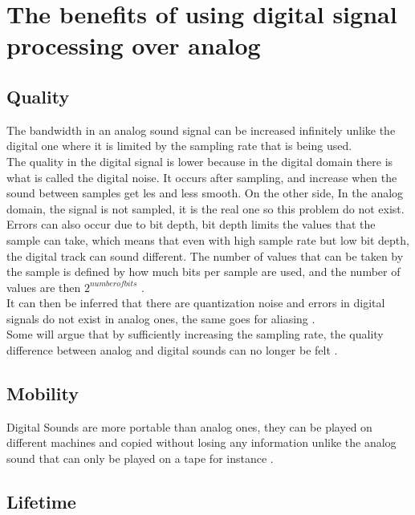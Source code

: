 \section{The benefits of using digital signal processing over analog}
\subsection{Quality}

The bandwidth in an analog sound signal can be increased infinitely unlike the digital one where it is limited by the sampling rate that is being used. \\

The quality in the digital signal is  lower because in the digital domain there is what is called the digital noise. It occurs after sampling, and increase when the sound between samples get les and less smooth. On the other side, In the analog domain, the signal is not sampled, it is the real one so this problem do not exist. Errors can also occur due to bit depth, bit depth limits the values that the sample can take, which means that even with high sample rate but low bit depth, the digital track can sound different. The number of values that can be taken by the sample is defined by how much bits per sample are used, and the number of values are then $2^{number of bits}$ \citep{analog_quality}.\\
It can then be inferred that there are quantization noise and errors in digital signals do not exist in analog ones, the same goes for aliasing \citep{analog_aliasing}. \\

Some will argue that by sufficiently increasing the sampling rate, the quality difference between analog and digital sounds can no longer be felt \citep{analog_storage}.

\subsection{Mobility}

Digital Sounds are more portable than analog ones, they can be played on different machines and copied without losing any information unlike the analog sound that can only be played on a tape for instance \citep{analog_quality}. 

\subsection{Lifetime}

